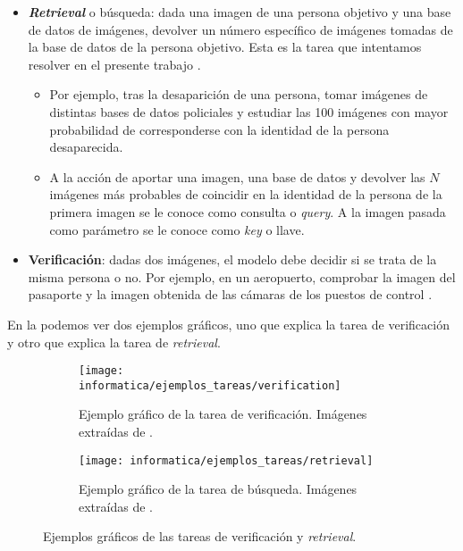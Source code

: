 \begin{itemize}
	\item \textbf{\textit{Retrieval}} o búsqueda: dada una imagen de una persona objetivo y una base de datos de imágenes, devolver un número específico de imágenes tomadas de la base de datos de la persona objetivo. Esta es la tarea que intentamos resolver en el presente trabajo \footnotemark.

	      \begin{itemize}
		      \item Por ejemplo, tras la desaparición de una persona, tomar imágenes de distintas bases de datos policiales y estudiar las 100 imágenes con mayor probabilidad de corresponderse con la identidad de la persona desaparecida.
		      \item A la acción de aportar una imagen, una base de datos y devolver las $N$ imágenes más probables de coincidir en la identidad de la persona de la primera imagen se le conoce como consulta o \textit{query}. A la imagen pasada como parámetro se le conoce como \textit{key} o llave.
	      \end{itemize}

	\item \textbf{Verificación}: dadas dos imágenes, el modelo debe decidir si se trata de la misma persona o no. Por ejemplo, en un aeropuerto, comprobar la imagen del pasaporte y la imagen obtenida de las cámaras de los puestos de control \cite{informatica:docface}.
\end{itemize}


En la  podemos ver dos ejemplos gráficos, uno que explica la tarea de verificación y otro que explica la tarea de \textit{retrieval}.

\begin{figure}
	\centering
	\begin{subfigure}{1.0\textwidth}
		\centering
		\texttt{[image: informatica/ejemplos\_tareas/verification]}
		\caption{Ejemplo gráfico de la tarea de verificación. Imágenes extraídas de \cite{informatica:cacd_dataset}.}
	\end{subfigure}%

	\begin{subfigure}{1.0\textwidth}
		\centering
		\texttt{[image: informatica/ejemplos\_tareas/retrieval]}
		\caption{Ejemplo gráfico de la tarea de búsqueda. Imágenes extraídas de \cite{informatica:cacd_dataset}.}
	\end{subfigure}
	\caption{Ejemplos gráficos de las tareas de verificación y \textit{retrieval}.}
	\label{img:ejemplo_verificacion_retrieval}
\end{figure}

